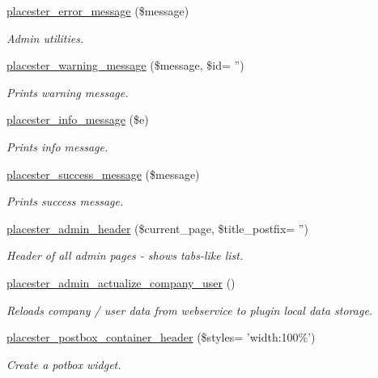 \begin{DoxyCompactItemize}
\hyperlink{admin_2init_8php_a7ac6bbf88777a747233b9d0c2dac5b8f}{placester\_\-error\_\-message} (\$message)
\begin{DoxyCompactList}\small\item\em Admin utilities. \end{DoxyCompactList}\item 
\hyperlink{admin_2init_8php_a1fb7be7fcc831e78a5dfe54528d214b8}{placester\_\-warning\_\-message} (\$message, \$id= '')
\begin{DoxyCompactList}\small\item\em Prints warning message. \end{DoxyCompactList}\item 
\hyperlink{admin_2init_8php_a81389e9deb699f2a9c7844e083e3eb32}{placester\_\-info\_\-message} (\$e)
\begin{DoxyCompactList}\small\item\em Prints info message. \end{DoxyCompactList}\item 
\hyperlink{admin_2init_8php_ace54acd957fbecd9609742ec8690e625}{placester\_\-success\_\-message} (\$message)
\begin{DoxyCompactList}\small\item\em Prints success message. \end{DoxyCompactList}\item 
\hyperlink{admin_2init_8php_ac306b7f3f033fc199b5674c8a8d6a312}{placester\_\-admin\_\-header} (\$current\_\-page, \$title\_\-postfix= '')
\begin{DoxyCompactList}\small\item\em Header of all admin pages -\/ shows tabs-\/like list. \end{DoxyCompactList}\item 
\hyperlink{admin_2init_8php_a2c6cbff93305f2e4d980c1c16feec2c8}{placester\_\-admin\_\-actualize\_\-company\_\-user} ()
\begin{DoxyCompactList}\small\item\em Reloads company / user data from webservice to plugin local data storage. \end{DoxyCompactList}\item 
\hyperlink{admin_2init_8php_a56233d464f8b7a4b7c9ae2a70cfe9a72}{placester\_\-postbox\_\-container\_\-header} (\$styles= 'width:100\%')
\begin{DoxyCompactList}\small\item\em Create a potbox widget. \end{DoxyCompactList}\item 

\end{DoxyCompactItemize}
